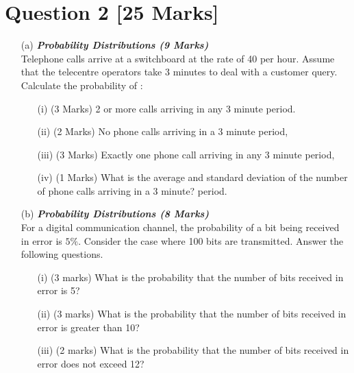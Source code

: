 
\section*{Question 2 [25 Marks]} 
\begin{itemize}
\item[(a)] \textbf{\textit{Probability Distributions (9 Marks)}}\\
Telephone calls arrive at a switchboard at the rate of 40 per hour.  Assume that the telecentre operators take 3 minutes to deal with a customer query.  Calculate the probability of :
\begin{itemize} 
\item[(i)] (3 Marks)                 2 or more calls arriving in any 3 minute period.
\item[(ii)] (2 Marks)               No phone calls arriving in a 3 minute period,
\item[(iii)] (3 Marks)              Exactly one phone call arriving in any 3 minute period,
\item[(iv)] (1 Marks)             What is the average and standard deviation of the number of phone calls arriving in a 3 minute? period.
\end{itemize}


\bigskip

\item[(b)] \textbf{\textit{Probability Distributions (8 Marks)}}\\
For a digital communication channel, the probability of a bit being received in error is $5\%$. Consider the case where 100 bits are transmitted. Answer the following questions.

\begin{itemize}
\item[(i)] (3 marks)	What is the probability that the number of bits received in error is 5?
\item[(ii)] (3 marks) What is the probability that the number of bits received in error is greater than 10?
\item[(iii)] (2 marks)	What is the probability that the number of bits received in error does not exceed 12?
\end{itemize}


\end{itemize}
